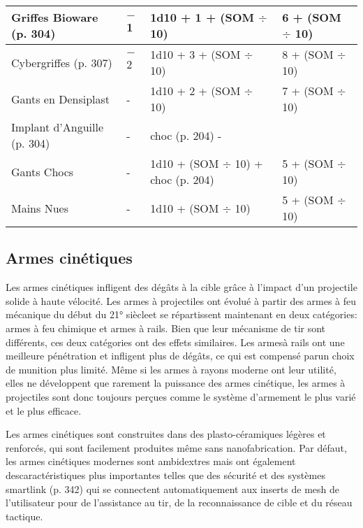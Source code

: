 \begin{table}
\begin{tabularx}{\textwidth}{|l|X|l|l|}
Griffes Bioware (p. 304)	&$-$1	&1d10 + 1 + (SOM $\div$ 10)	&6 + (SOM $\div$ 10) \\ \hline

Cybergriffes (p. 307)	&$-$2	&1d10 + 3 + (SOM $\div$ 10)	&8 + (SOM $\div$ 10) \\ \hline

Gants en Densiplast	&- &1d10 + 2 + (SOM $\div$ 10)	&7 + (SOM $\div$ 10) \\ \hline

Implant d'Anguille (p. 304)	&- &choc (p. 204)	- \\ \hline

Gants Chocs	&- &1d10 + (SOM $\div$ 10) + choc (p. 204)	&5 + (SOM $\div$ 10) \\ \hline

Mains Nues	&- &1d10 + (SOM $\div$ 10)	&5 + (SOM $\div$ 10) \\ \hline

\end{tabularx} \label{tab:meleeweapons} \end{table} 

\subsection{Armes cinétiques} \label{sec:kinetic-weapons} 

Les armes cinétiques infligent des dégâts à la cible grâce à l'impact d'un projectile solide à haute vélocité. Les armes à projectiles ont évolué à partir des armes à feu mécanique du début du 21° siècleet se répartissent maintenant en deux catégories: armes à feu chimique et armes à rails. Bien que leur mécanisme de tir sont différents, ces deux catégories ont des effets similaires. Les armesà rails ont une meilleure pénétration et infligent plus de dégâts, ce qui est compensé parun choix de munition plus limité. Même si les armes à rayons moderne ont leur utilité, elles ne développent que rarement la puissance des armes cinétique, les armes à projectiles sont donc toujours perçues comme le système d'armement le plus varié et le plus efficace. 

Les armes cinétiques sont construites dans des plasto-céramiques légères et renforcés, qui sont facilement produites même sans nanofabrication. Par défaut, les armes cinétiques modernes sont ambidextres mais ont également descaractéristiques plus importantes telles que des sécurité et des systèmes smartlink (p. 342) qui se connectent automatiquement aux inserts de mesh de l'utilisateur pour de l'assistance au tir, de la reconnaissance de cible et du réseau tactique. 

